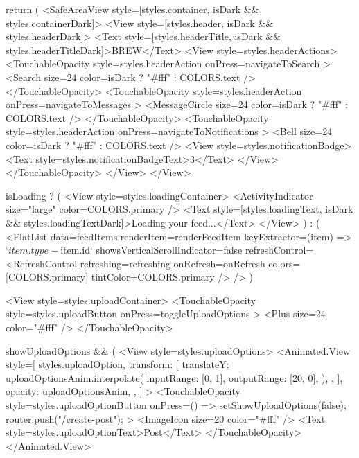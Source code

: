 {  return (
    <SafeAreaView style={[styles.container, isDark && styles.containerDark]}>
      <View style={[styles.header, isDark && styles.headerDark]}>
        <Text style={[styles.headerTitle, isDark && styles.headerTitleDark]}>BREW</Text>
        <View style={styles.headerActions}>
          <TouchableOpacity 
            style={styles.headerAction}
            onPress={navigateToSearch}
          >
            <Search size={24} color={isDark ? "#fff" : COLORS.text} />
          </TouchableOpacity>
          <TouchableOpacity 
            style={styles.headerAction}
            onPress={navigateToMessages}
          >
            <MessageCircle size={24} color={isDark ? "#fff" : COLORS.text} />
          </TouchableOpacity>
          <TouchableOpacity 
            style={styles.headerAction}
            onPress={navigateToNotifications}
          >
            <Bell size={24} color={isDark ? "#fff" : COLORS.text} />
            <View style={styles.notificationBadge}>
              <Text style={styles.notificationBadgeText}>3</Text>
            </View>
          </TouchableOpacity>
        </View>
      </View>

      {isLoading ? (
        <View style={styles.loadingContainer}>
          <ActivityIndicator size="large" color={COLORS.primary} />
          <Text style={[styles.loadingText, isDark && styles.loadingTextDark]}>Loading your feed...</Text>
        </View>
      ) : (
        <FlatList
          data={feedItems}
          renderItem={renderFeedItem}
          keyExtractor={(item) => `${item.type}-${item.id}`}
          showsVerticalScrollIndicator={false}
          refreshControl={
            <RefreshControl
              refreshing={refreshing}
              onRefresh={onRefresh}
              colors={[COLORS.primary]}
              tintColor={COLORS.primary}
            />
          }
        />
      )}

      <View style={styles.uploadContainer}>
        <TouchableOpacity
          style={styles.uploadButton}
          onPress={toggleUploadOptions}
        >
          <Plus size={24} color="#fff" />
        </TouchableOpacity>

        {showUploadOptions && (
          <View style={styles.uploadOptions}>
            <Animated.View
              style={[
                styles.uploadOption,
                {
                  transform: [
                    {
                      translateY: uploadOptionsAnim.interpolate({
                        inputRange: [0, 1],
                        outputRange: [20, 0],
                      }),
                    },
                  ],
                  opacity: uploadOptionsAnim,
                },
              ]}
            >
              <TouchableOpacity 
                style={styles.uploadOptionButton}
                onPress={() => {
                  setShowUploadOptions(false);
                  router.push("/create-post");
                }}
              >
                <ImageIcon size={20} color="#fff" />
                <Text style={styles.uploadOptionText}>Post</Text>
              </TouchableOpacity>
            </Animated.View>
            
}}
